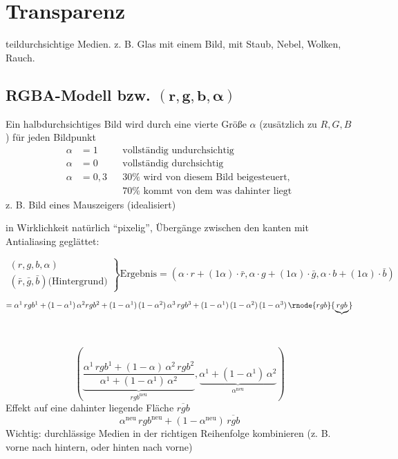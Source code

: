 \chapter{Transparenz}
\begin{center}
\end{center}
teildurchsichtige Medien. z. B. Glas mit einem Bild, mit Staub, Nebel, Wolken, Rauch.

\section{RGBA-Modell bzw. $\boldsymbol{(r, g, b, \alpha)}$}
Ein halbdurchsichtiges Bild wird durch eine vierte Größe $\alpha$ (zusätzlich zu $R, G, B$) für jeden Bildpunkt
\begin{align*}
 \alpha &= 1 & &\text{vollständig undurchsichtig}\\
 \alpha &= 0 & &\text{vollständig durchsichtig}\\
 \alpha &= 0{,3} & &\text{$30\%$ wird von diesem Bild beigesteuert, }\\
	&	& &\text{$70\%$ kommt von dem was dahinter liegt}
\end{align*}
z. B. Bild eines Mauszeigers (idealisiert)
\begin{center}
\end{center}
in Wirklichkeit natürlich "`pixelig"', Übergänge zwischen den kanten mit Antialiasing geglättet:
\begin{center}
\end{center}
\[
\left.
 \begin{array}{r}
  (r,g,b,\alpha)\\
 (\bar r, \bar g, \bar b) \text{(Hintergrund)}
  \end{array}\right\} \text{Ergebnis} = (\alpha \cdot r + (1 \alpha)\cdot \bar r,
					\alpha \cdot g + (1 \alpha)\cdot \bar g,
					\alpha \cdot b + (1 \alpha)\cdot \bar b)
\]
\begin{center}
\end{center}
 $= \alpha^1\,rgb^1 + (1 - \alpha^1)\,\alpha^2rgb^2 + (1-\alpha^1)\,(1-\alpha^2)\,\alpha^3\,rgb^3
	+ (1-\alpha^1)\,(1-\alpha^2)\,(1-\alpha^3)\,\rnode{rgb}{\underbrace{rgb}}$
	\begin{center}
	  \hspace{5cm} \\[1em]
	\end{center}
	\[\left(\underbrace{\frac{\alpha^1\,rgb^1 + (1 - \alpha)\,\alpha^2\,rgb^2}{\alpha^1 + (1-\alpha^1)\,\alpha^2}}_
		{rgb^\mathrm{neu}}, \underbrace{\alpha^1 + (1-\alpha^1)\,\alpha^2}_{\alpha^\mathrm{neu}}\right)\]
		Effekt auf eine dahinter liegende Fläche $\overline{rgb}$
		\[\alpha^\mathrm{neu} \, rgb^\mathrm{neu} + (1-\alpha^\mathrm{neu})\,\overline{rgb}\]
Wichtig: durchlässige Medien in der richtigen Reihenfolge kombinieren (z. B. vorne nach hintern, oder hinten nach vorne)

